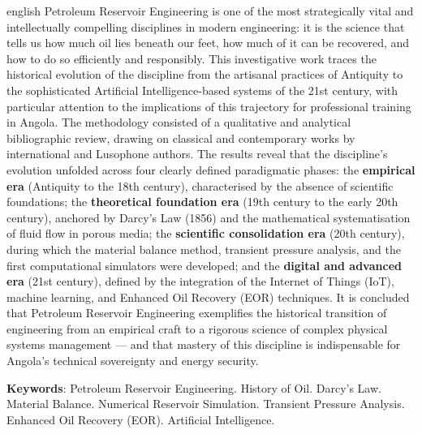 \documentclass[
  12pt,
  a4paper,
  oneside,
  brazilian,
  sumario=tradicional
]{abntex2}
\begin{document}
\begin{resumo}[Abstract]
\begin{otherlanguage*}{english}
Petroleum Reservoir Engineering is one of the most strategically vital
and intellectually compelling disciplines in modern engineering: it is
the science that tells us how much oil lies beneath our feet, how much
of it can be recovered, and how to do so efficiently and responsibly.
This investigative work traces the historical evolution of the
discipline from the artisanal practices of Antiquity to the sophisticated
Artificial Intelligence-based systems of the 21st century, with
particular attention to the implications of this trajectory for
professional training in Angola. The methodology consisted of a
qualitative and analytical bibliographic review, drawing on classical
and contemporary works by international and Lusophone authors. The
results reveal that the discipline's evolution unfolded across four
clearly defined paradigmatic phases: the \textbf{empirical era}
(Antiquity to the 18th century), characterised by the absence of
scientific foundations; the \textbf{theoretical foundation era} (19th
century to the early 20th century), anchored by Darcy's Law (1856)
and the mathematical systematisation of fluid flow in porous media;
the \textbf{scientific consolidation era} (20th century), during which
the material balance method, transient pressure analysis, and the first
computational simulators were developed; and the \textbf{digital and
advanced era} (21st century), defined by the integration of the
Internet of Things (IoT), machine learning, and Enhanced Oil Recovery
(EOR) techniques. It is concluded that Petroleum Reservoir Engineering
exemplifies the historical transition of engineering from an empirical
craft to a rigorous science of complex physical systems management —
and that mastery of this discipline is indispensable for Angola's
technical sovereignty and energy security.

\vspace{\onelineskip}
\noindent
\textbf{Keywords}: Petroleum Reservoir Engineering. History of Oil.
Darcy's Law. Material Balance. Numerical Reservoir Simulation. Transient
Pressure Analysis. Enhanced Oil Recovery (EOR). Artificial Intelligence.
\end{otherlanguage*}
\end{resumo}

\listoffigures*
\cleardoublepage
\end{document}
